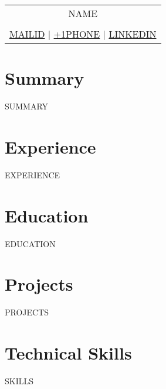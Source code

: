 \documentclass[a4paper,3pt]{article}
\begin{document}
\pagestyle{empty} 


\begin{tabularx}{\linewidth}{@{} C @{}}
\color[HTML]{1C033C} \Huge{{{NAME}}} \\[0.5pt]
\\
{\href{mailto: {{MAILID}}}{\raisebox{-0.05\height}{\faEnvelope} {{MAILID}}} $|$}
{\href{tel:+1{{PHONE}}}{\raisebox{-0.05\height}{\faMobile} +1{{PHONE}}}  $|$}
{\href{{{LINKEDIN}}}{\raisebox{-0.05\height}{\faLinkedin} {{LINKEDIN}}}}
\end{tabularx}

\section{Summary}
{{SUMMARY}}

\section{Experience}

{{EXPERIENCE}}

\section{Education}
{{EDUCATION}}

\section{Projects}

{{PROJECTS}}


\section{Technical Skills}
\begin{itemize}[nosep,after=\strut, leftmargin=2em, itemsep=1pt]
    {{SKILLS}}
     \end{itemize}
\end{document}
